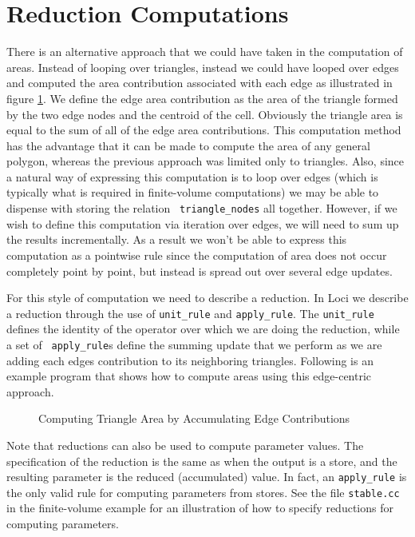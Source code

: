 \documentclass[10pt,epsf]{book}
\begin{document}


\section{Reduction Computations}

There is an alternative approach that we could have taken in the
computation of areas.  Instead of looping over triangles, instead we
could have looped over edges and computed the area contribution
associated with each edge as illustrated in figure \ref{fig:area}.  We
define the edge area contribution as the area of the triangle formed
by the two edge nodes and the centroid of the cell.  Obviously the
triangle area is equal to the sum of all of the edge area
contributions.  This computation method has the advantage that it can
be made to compute the area of any general polygon, whereas the
previous approach was limited only to triangles.  Also, since a
natural way of expressing this computation is to loop over edges
(which is typically what is required in finite-volume computations) we
may be able to dispense with storing the relation {\tt
  triangle\_nodes} all together.  However, if we wish to define this
computation via iteration over edges, we will need to sum up the
results incrementally.  As a result we won't be able to express this
computation as a pointwise rule since the computation of area does not
occur completely point by point, but instead is spread out over
several edge updates.

For this style of computation we need to describe a reduction.  In
Loci we describe a reduction through the use of {\tt unit\_rule} and
{\tt apply\_rule}.  The {\tt unit\_rule} defines the identity of the
operator over which we are doing the reduction, while a set of {\tt
  apply\_rule}s define the summing update that we perform as we are
adding each edges contribution to its neighboring triangles.
Following is an example program that shows how to compute areas using
this edge-centric approach.

\begin{figure}[h]
\centerline{
\epsfxsize=3.2in
}
\caption{Computing Triangle Area by Accumulating Edge Contributions}
\label{fig:area}
\end{figure}

Note that reductions can also be used to compute parameter values.
The specification of the reduction is the same as when the output is
a store, and the resulting parameter is the reduced (accumulated)
value.  In fact, an {\tt apply\_rule} is the only valid rule for
computing parameters from stores.  See the file {\tt stable.cc} in the
finite-volume example for an illustration of how to specify reductions
for computing parameters.
\end{document}
